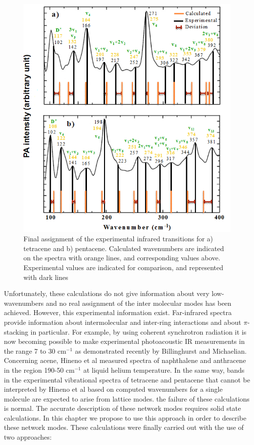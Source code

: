  \begin{figure}[H]
 	\centering
 	\includegraphics[scale=0.8]{image/final-exp}
 	\caption[Final assignment of the experimental infrared transitions for tetracene and pentacene]{Final assignment of the experimental infrared transitions for a) tetracene and b) pentacene. Calculated wavenumbers are indicated on the spectra with orange lines, and corresponding values above. Experimental values are indicated for comparison, and represented with dark lines} \label{figure9}
 \end{figure}

Unfortunately, these calculations do not give information about very low-wavenumbers and no real assignment of the inter molecular modes has been achieved. However, this experimental information exist. Far-infrared spectra provide information about intermolecular and inter-ring interactions and about $\pi$-stacking in particular. For example, by using coherent synchrotron radiation it is now becoming possible to make experimental photoacoustic IR measurements in the range 7 to 30 cm$^{-1}$ as demonstrated recently by Billinghurst and Michaelian\cite{billinghurst2010photoacoustic}. Concerning acene, Hineno et al \cite{hineno1975far}  measured spectra of naphthalene and anthracene in the region 190-50 cm$^{-1}$ at liquid helium temperature. In the same way, bands in the experimental vibrational spectra of tetracene and pentacene that cannot be interpreted by Hineno et al based on computed wavenumbers for a single molecule are expected to arise from lattice modes. the failure of these calculations is normal. The accurate description of these network modes requires solid state calculations. In this chapter we propose to use this approach in order to describe these network modes. These calculations were finally carried out with the use of two approaches:\\

